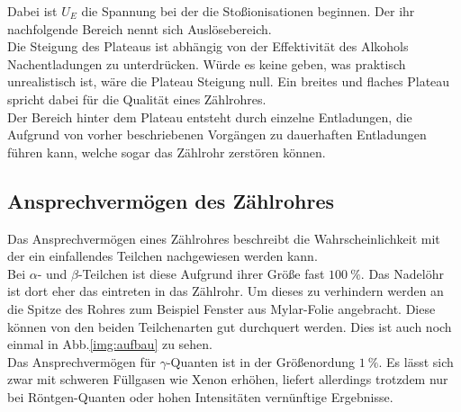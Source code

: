 \noindent
Dabei ist $U_E$ die Spannung bei der die Stoßionisationen beginnen. Der ihr nachfolgende Bereich nennt sich Auslösebereich.\\
Die Steigung des Plateaus ist abhängig von der Effektivität des Alkohols Nachentladungen zu unterdrücken. Würde es keine geben, was praktisch unrealistisch ist, wäre die Plateau Steigung null.
Ein breites und flaches Plateau spricht dabei für die Qualität eines Zählrohres.\\
Der Bereich hinter dem Plateau entsteht durch einzelne Entladungen, die Aufgrund von vorher beschriebenen Vorgängen zu dauerhaften Entladungen führen kann, welche sogar das Zählrohr zerstören können.\\

\subsection{Ansprechvermögen des Zählrohres}

\noindent
Das Ansprechvermögen eines Zählrohres beschreibt die Wahrscheinlichkeit mit der ein einfallendes Teilchen nachgewiesen werden kann.\\
Bei $\alpha$- und $\beta$-Teilchen ist diese Aufgrund ihrer Größe fast $\SI{100}{\percent}$. Das Nadelöhr ist dort eher das eintreten in das Zählrohr. 
Um dieses zu verhindern werden an die Spitze des Rohres zum Beispiel Fenster aus Mylar-Folie angebracht. Diese können von den beiden Teilchenarten gut durchquert werden.
Dies ist auch noch einmal in Abb.\ref{img:aufbau} zu sehen.\\
Das Ansprechvermögen für $\gamma$-Quanten ist in der Größenordung $\SI{1}{\percent}$. Es lässt sich zwar mit schweren Füllgasen wie Xenon erhöhen, liefert allerdings trotzdem nur bei Röntgen-Quanten
oder hohen Intensitäten vernünftige Ergebnisse.

